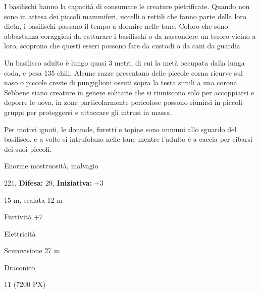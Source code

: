 \begin{multicols}{2}
{I basilischi hanno la capacità di consumare le creature pietrificate. Quando non sono in attesa dei piccoli mammiferi, uccelli o rettili che fanno parte della loro dieta, i basilischi passano il tempo a dormire nelle tane. Coloro che sono abbastanza coraggiosi da catturare i basilischi o da nascondere un tesoro vicino a loro, scoprono che questi esseri possono fare da custodi o da cani da guardia.

Un basilisco adulto è lungo quasi 3 metri, di cui la metà occupata dalla lunga coda, e pesa 135 chili. Alcune razze presentano delle piccole corna ricurve sul naso o piccole creste di pungiglioni ossuti sopra la testa simili a una corona. Sebbene siano creature in genere solitarie che si riuniscono solo per accoppiarsi e deporre le uova, in zone particolarmente pericolose possono riunirsi in piccoli gruppi per proteggersi e attaccare gli intrusi in massa.

Per motivi ignoti, le donnole, furetti e topine sono immuni allo sguardo del basilisco, e a volte si intrufolano nelle tane mentre l'adulto è a caccia per cibarsi dei suoi piccoli.


\noindent
\begin{description}[noitemsep, topsep=0pt, parsep=0pt, partopsep=0pt, leftmargin=0cm, labelwidth=2.2cm]
	\item[\textbf{Taglia/Tipo:}] Enorme mostruosità, malvagio
	\item[\textbf{Caratt.:}] 
	\item[\textbf{Punti Ferita:}] 221,  \textbf{Difesa:} 29,  \textbf{Iniziativa:} +3
	\item[\textbf{Movimento:}] 15 m, scalata 12 m
	\item[\textbf{Tiri Salvez.:}] 
	\item[\textbf{Comp.:}] Furtività +7
	\item[\textbf{Imm. Danni:}] Elettricità
	\item[\textbf{Sensi:}] Scurovisione 27 m
	\item[\textbf{Linguaggi:}] Draconico
	\item[\textbf{Sfida:}] 11 (7200 PX)\smallskip
\end{description}

}
\end{multicols}

